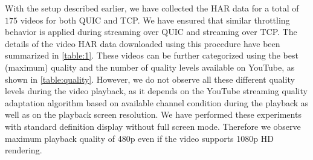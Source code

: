With the setup described earlier, we have collected the \ac{HAR} data for a total of $175$ videos for both \ac{QUIC} and \ac{TCP}. We have ensured that similar throttling behavior is applied during streaming over \ac{QUIC} and streaming over \ac{TCP}. The details of the video \ac{HAR} data downloaded using this procedure have been summarized in \tbl\ref{table:1}. These videos can be further categorized using the best (maximum) quality and the number of quality levels available on YouTube, as shown in \tbl\ref{table:quality}. However, we do not observe all these different quality levels during the video playback, as it depends on the YouTube streaming quality adaptation algorithm based on available channel condition during the playback as well as on the playback screen resolution. We have performed these experiments with standard definition display without full screen mode. Therefore we observe maximum playback quality of 480p even if the video supports 1080p \ac{HD} rendering. 




